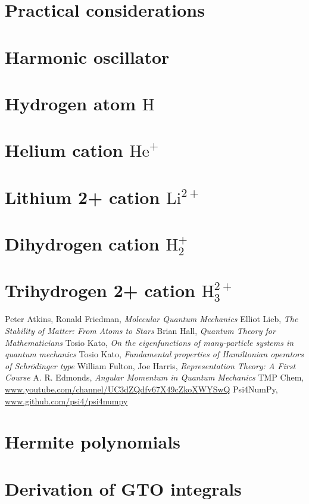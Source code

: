 \documentclass{article}
\newcommand{\molecule}[1]{\textrm{#1}}
\begin{document}
\section{Practical considerations}
\section{Harmonic oscillator} \label{sec:harmonic}
\section{Hydrogen atom \(\molecule{H}\)}
\section{Helium cation \(\molecule{He}^+\)} 
\section{Lithium 2+ cation \(\molecule{Li}^{2+}\)}
\section{Dihydrogen cation \(\molecule{H}_2^+\)}
\section{Trihydrogen 2+ cation \(\molecule{H}_3^{2+}\)}

\begin{thebibliography}{9}
	Peter Atkins, Ronald Friedman,
	\textit{Molecular Quantum Mechanics}
	Elliot Lieb,
	\textit{The Stability of Matter: From Atoms to Stars}
	Brian Hall,
	\textit{Quantum Theory for Mathematicians}
	Tosio Kato,
	\textit{On the eigenfunctions of many-particle systems in quantum mechanics}
	Tosio Kato,
	\textit{Fundamental properties of Hamiltonian operators of Schrödinger type}
	William Fulton, Joe Harris,
	\textit{Representation Theory: A First Course}
	A. R. Edmonds,
	\textit{Angular Momentum in Quantum Mechanics}
	TMP Chem,
	\url{www.youtube.com/channel/UC3dZQdfv67X49cZkoXWYSwQ}
	Psi4NumPy,
	\url{www.github.com/psi4/psi4numpy}
\end{thebibliography}

\begin{appendices}
\section{Hermite polynomials} \label{apx:hermite}
\section{Derivation of GTO integrals} \label{apx:integrals}
\end{appendices}
\end{document}
